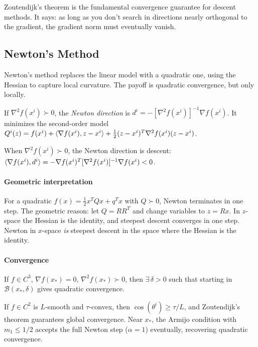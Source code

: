 Zoutendijk's theorem is the fundamental convergence guarantee for descent methods.
It says: as long as you don't search in directions nearly orthogonal to the gradient, the gradient norm must eventually vanish.


\subsection{Newton's Method}\label{sec:newton-multivariate}

Newton's method replaces the linear model with a quadratic one, using the Hessian to capture local curvature.
The payoff is quadratic convergence, but only locally.

\begin{definition}\label{def:newton-dir}
	If $\nabla^2 f(x^i) \succ 0$, the \emph{Newton direction} is
	$d^i = -[\nabla^2 f(x^i)]^{-1} \nabla f(x^i)$.
	It minimizes the second-order model $Q^i(z) = f(x^i) + \langle\nabla f(x^i), z - x^i\rangle + \frac{1}{2}(z - x^i)^T \nabla^2 f(x^i)(z - x^i)$.
\end{definition}

When $\nabla^2 f(x^i) \succ 0$, the Newton direction is descent: $\langle\nabla f(x^i), d^i\rangle = -\nabla f(x^i)^T [\nabla^2 f(x^i)]^{-1} \nabla f(x^i) < 0$.

\paragraph{Geometric interpretation}

For a quadratic $f(x) = \frac{1}{2} x^T Q x + q^T x$ with $Q \succ 0$, Newton terminates in one step.
The geometric reason: let $Q = RR^T$ and change variables to $z = Rx$.
In $z$-space the Hessian is the identity, and steepest descent converges in one step.
Newton in $x$-space \emph{is} steepest descent in the space where the Hessian is the identity.

\paragraph{Convergence}

\begin{theorem}\label{thm:newton-quad}
	If $f \in C^3$, $\nabla f(x_*) = 0$, $\nabla^2 f(x_*) \succ 0$, then $\exists\, \delta > 0$ such that starting in $\mathcal{B}(x_*, \delta)$ gives quadratic convergence.
\end{theorem}

\begin{theorem}\label{thm:newton-global}
	If $f \in C^2$ is $L$-smooth and $\tau$-convex, then $\cos(\theta^i) \geq \tau/L$, and Zoutendijk's theorem guarantees global convergence.
	Near $x_*$, the Armijo condition with $m_1 \leq 1/2$ accepts the full Newton step ($\alpha = 1$) eventually, recovering quadratic convergence.
\end{theorem}


